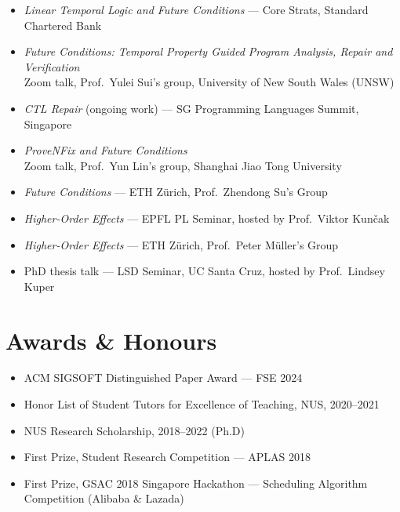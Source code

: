 \documentclass[11pt, a4paper]{article}
\newcommand{\yeartag}[1]{%
  \makebox[1.5cm][l]{\textcolor{clrmuted}{\footnotesize #1}}}
\begin{document}
\begin{itemize}[leftmargin=0pt, label={}]

  \item \yeartag{May 2026}
  \emph{Linear Temporal Logic and Future Conditions} --- Core Strats, Standard Chartered Bank

  \item \yeartag{Jun 2025}
  \emph{Future Conditions: Temporal Property Guided Program Analysis, Repair and Verification}\\
  \hspace*{1.65cm}Zoom talk, Prof.\ Yulei Sui's group, University of New South Wales (UNSW)

  \item \yeartag{Dec 2024}
  \emph{CTL Repair} (ongoing work) --- SG Programming Languages Summit, Singapore

  \item \yeartag{Oct 2024}
  \emph{ProveNFix and Future Conditions}\\
  \hspace*{1.65cm}Zoom talk, Prof.\ Yun Lin's group, Shanghai Jiao Tong University

  \item \yeartag{Sep 2024}
  \emph{Future Conditions} --- ETH Z\"{u}rich, Prof.\ Zhendong Su's Group

  \item \yeartag{Sep 2024}
  \emph{Higher-Order Effects} --- EPFL PL Seminar, hosted by Prof.\ Viktor Kun\v{c}ak

  \item \yeartag{Sep 2024}
  \emph{Higher-Order Effects} --- ETH Z\"{u}rich, Prof.\ Peter M\"{u}ller's Group

  \item \yeartag{Nov 2022}
  PhD thesis talk --- LSD Seminar, UC Santa Cruz, hosted by Prof.\ Lindsey Kuper

\end{itemize}

\section{Awards \& Honours}

\begin{itemize}

  \item {ACM SIGSOFT Distinguished Paper Award} --- FSE 2024

  \item Honor List of Student Tutors for Excellence of Teaching, NUS, 2020--2021

  \item NUS Research Scholarship, 2018--2022 (Ph.D)

  \item {First Prize, Student Research Competition} --- APLAS 2018

  \item {First Prize, GSAC 2018 Singapore Hackathon} ---
        Scheduling Algorithm Competition (Alibaba \& Lazada)

\end{itemize}
\end{document}

